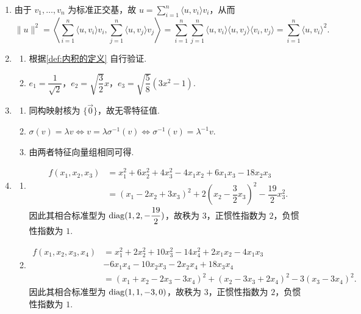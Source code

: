 \begin{enumerate}
    \item 由于 $v_1,\ldots,v_n$ 为标准正交基，故 $u = \displaystyle\sum_{i=1}^n \langle u, v_i \rangle v_i$，从而
    \[
        \|u\|^2 = \left\langle \sum_{i=1}^n \langle u, v_i \rangle v_i, \sum_{j=1}^n \langle u, v_j \rangle v_j \right\rangle = \sum_{i=1}^n \sum_{j=1}^n \langle u, v_i \rangle \langle u, v_j \rangle \langle v_i, v_j \rangle = \sum_{i=1}^n \langle u, v_i \rangle^2.
    \]

    \item
    \begin{enumerate}
        \item 根据\autoref{def:内积的定义} 自行验证.
        \item $e_1 = \dfrac{1}{\sqrt{2}}$，$e_2 = \sqrt{\dfrac{3}{2}} x$，$e_3 = \sqrt{\dfrac{5}{8}}(3x^2 - 1)$.
    \end{enumerate}

    \item
    \begin{enumerate}
        \item 同构映射核为 $\{\vec{0}\}$，故无零特征值.
        \item $\sigma(v)=\lambda v \iff v = \lambda \sigma^{-1}(v) \iff \sigma^{-1}(v) = \lambda^{-1}v$.
        \item 由两者特征向量组相同可得.
    \end{enumerate}

    \item
    \begin{enumerate}
        \item \begin{align*}
            f(x_1,x_2,x_3) &= x_1^2+ 6x_2^2 + 4x_3^2 - 4x_1x_2+ 6x_1x_3 - 18x_2x_3 \\
            &= (x_1 - 2x_2 + 3x_3)^2 + 2(x_2 - \dfrac{3}{2}x_3)^2 - \dfrac{19}{2}x_3^2.
        \end{align*}
        因此其相合标准型为 $\operatorname{diag}(1, 2, -\dfrac{19}{2})$，故秩为 $3$，正惯性指数为 $2$，负惯性指数为 $1$.
        \item \begin{align*}
            f(x_1,x_2,x_3,x_4) &= x_1^2 + 2x_2^2 + 10x_3^2 - 14x_4^2 + 2x_1x_2 - 4x_1x_3 \\
            &- 6x_1x_4 - 10x_2x_3 - 2x_2x_4 + 18x_3x_4 \\
            &= (x_1 + x_2 - 2x_3 - 3x_4)^2 + (x_2 - 3x_3 + 2x_4)^2 - 3(x_3 - 3x_4)^2.
        \end{align*}
        因此其相合标准型为 $\operatorname{diag}(1, 1, -3, 0)$，故秩为 $3$，正惯性指数为 $2$，负惯性指数为 $1$.
    \end{enumerate}


\end{enumerate}
